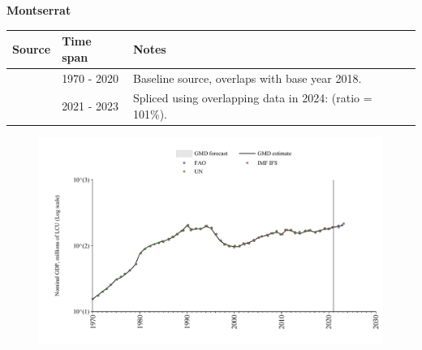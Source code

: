 \documentclass[12pt,a4paper,landscape]{article}
\begin{document}
\begin{adjustbox}{max totalsize={\paperwidth}{\paperheight},center}
\begin{minipage}[t][\textheight][t]{\textwidth}
\vspace*{0.5cm}
{}
\begin{center}
{\Large\bfseries Montserrat}
\end{center}
\vspace{0.5cm}
\begin{table}[H]
\centering
\small
\begin{tabular}{|l|l|l|}
\hline
\textbf{Source} & \textbf{Time span} & \textbf{Notes} \\
\hline
\rowcolor{white}\cite{UN}& 1970 - 2020 &Baseline source, overlaps with base year 2018.\\
\rowcolor{lightgray}\cite{FAO}& 2021 - 2023 &Spliced using overlapping data in 2024: (ratio = 101\%).\\
\hline
\end{tabular}
\end{table}
\begin{figure}[H]
\centering
\includegraphics[width=\textwidth,height=0.6\textheight,keepaspectratio]{graphs/MSR_nGDP.pdf}
\end{figure}
\end{minipage}
\end{adjustbox}
\end{document}
